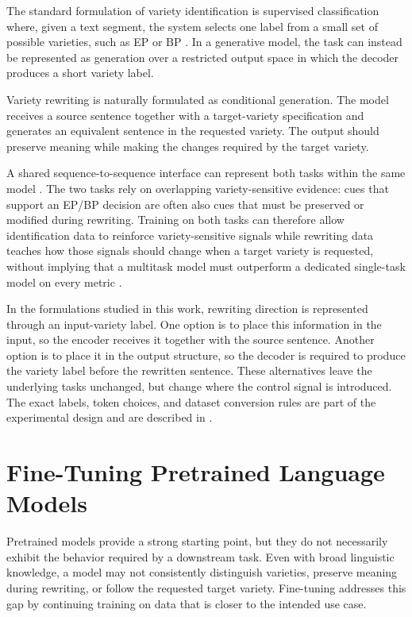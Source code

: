 The standard formulation of variety identification is supervised
classification where, given a text segment, the system selects one label from a
small set of possible varieties, such as EP or BP
\citep{DBLP:conf/konvens/ZampieriG12, sousa2025enhancingportuguesevarietyidentification}. In a
generative model, the task can instead be represented as generation over a
restricted output space in which the decoder produces a short variety label.

Variety rewriting is naturally formulated as conditional generation. The model
receives a source sentence together with a target-variety
specification and generates an equivalent sentence in the requested variety.
The output should preserve meaning while making the changes required by
the target variety.

A shared sequence-to-sequence interface can represent both tasks within the
same model \citep{Raffel2019ExploringTL}. The two tasks rely on overlapping
variety-sensitive evidence: cues that support an EP/BP decision are often also
cues that must be preserved or modified during rewriting. Training on both
tasks can therefore allow identification data to reinforce variety-sensitive
signals while rewriting data teaches how those signals should change when a
target variety is requested, without implying that a multitask model must
outperform a dedicated single-task model on every metric
\citep{10.1023/A:1007379606734}.

In the formulations studied in this work, rewriting direction is represented through an input-variety label. One option is to
place this information in the input, so the encoder receives it together with
the source sentence. Another option is to place it in the output structure, so
the decoder is required to produce the variety label before the rewritten
sentence. These alternatives leave the underlying tasks unchanged, but change
where the control signal is introduced. The exact labels, token choices, and
dataset conversion rules are part of the experimental design and are described
in .

\section{Fine-Tuning Pretrained Language Models}
\label{sec:fine-tuning}

Pretrained models provide a strong starting point, but they do not necessarily
exhibit the behavior required by a downstream task. Even with broad linguistic
knowledge, a model may not consistently distinguish varieties, preserve meaning
during rewriting, or follow the requested target variety. Fine-tuning addresses
this gap by continuing training on data that is closer to the intended use
case.

